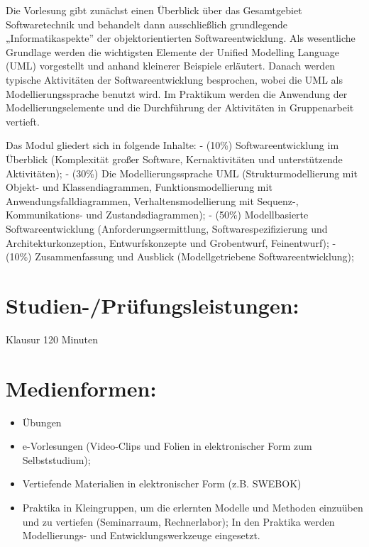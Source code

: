 Die Vorlesung gibt zunächst einen Überblick über das Gesamtgebiet
Softwaretechnik und behandelt dann ausschließlich grundlegende
„Informatikaspekte'' der objektorientierten Softwareentwicklung. Als
wesentliche Grundlage werden die wichtigsten Elemente der Unified
Modelling Language (UML) vorgestellt und anhand kleinerer Beispiele
erläutert. Danach werden typische Aktivitäten der Softwareentwicklung
besprochen, wobei die UML als Modellierungssprache benutzt wird. Im
Praktikum werden die Anwendung der Modellierungselemente und die
Durchführung der Aktivitäten in Gruppenarbeit vertieft.

Das Modul gliedert sich in folgende Inhalte: - (10\%)
Softwareentwicklung im Überblick (Komplexität großer Software,
Kernaktivitäten und unterstützende Aktivitäten); - (30\%) Die
Modellierungssprache UML (Strukturmodellierung mit Objekt- und
Klassendiagrammen, Funktionsmodellierung mit Anwendungsfalldiagrammen,
Verhaltensmodellierung mit Sequenz-, Kommunikations- und
Zustandsdiagrammen); - (50\%) Modellbasierte Softwareentwicklung
(Anforderungsermittlung, Softwarespezifizierung und
Architekturkonzeption, Entwurfskonzepte und Grobentwurf, Feinentwurf); -
(10\%) Zusammenfassung und Ausblick (Modellgetriebene
Softwareentwicklung);

\section{Studien-/Prüfungsleistungen:}\label{studien-pruxfcfungsleistungen-26}

Klausur 120 Minuten

\section{Medienformen:}\label{medienformen-26}

\begin{itemize}
\tightlist
\item
  Übungen
\item
  e-Vorlesungen (Video-Clips und Folien in elektronischer Form zum
  Selbststudium);
\item
  Vertiefende Materialien in elektronischer Form (z.B. SWEBOK)
\item
  Praktika in Kleingruppen, um die erlernten Modelle und Methoden
  einzuüben und zu vertiefen (Seminarraum, Rechnerlabor); In den
  Praktika werden Modellierungs- und Entwicklungswerkzeuge eingesetzt.
\end{itemize}

